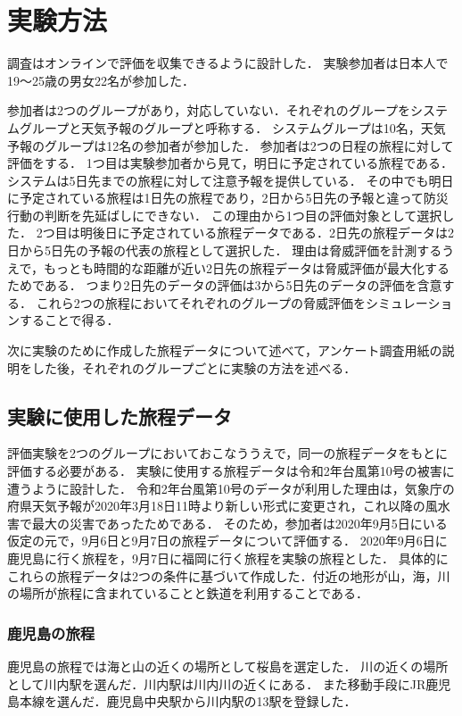 \section{実験方法}
調査はオンラインで評価を収集できるように設計した．
実験参加者は日本人で19〜25歳の男女22名が参加した．\par
参加者は2つのグループがあり，対応していない．それぞれのグループをシステムグループと天気予報のグループと呼称する．
システムグループは10名，天気予報のグループは12名の参加者が参加した．
参加者は2つの日程の旅程に対して評価をする．
1つ目は実験参加者から見て，明日に予定されている旅程である．システムは5日先までの旅程に対して注意予報を提供している．
その中でも明日に予定されている旅程は1日先の旅程であり，2日から5日先の予報と違って防災行動の判断を先延ばしにできない．
この理由から1つ目の評価対象として選択した．
2つ目は明後日に予定されている旅程データである．2日先の旅程データは2日から5日先の予報の代表の旅程として選択した．
理由は脅威評価を計測するうえで，もっとも時間的な距離が近い2日先の旅程データは脅威評価が最大化するためである．
つまり2日先のデータの評価は3から5日先のデータの評価を含意する．
これら2つの旅程においてそれぞれのグループの脅威評価をシミュレーションすることで得る．\par
次に実験のために作成した旅程データについて述べて，アンケート調査用紙の説明をした後，それぞれのグループごとに実験の方法を述べる．

\subsection{実験に使用した旅程データ}
評価実験を2つのグループにおいておこなううえで，同一の旅程データをもとに評価する必要がある．
実験に使用する旅程データは令和2年台風第10号の被害に遭うように設計した．
令和2年台風第10号のデータが利用した理由は，気象庁の府県天気予報が2020年3月18日11時より新しい形式に変更され，これ以降の風水害で最大の災害であったためである．
そのため，参加者は2020年9月5日にいる仮定の元で，9月6日と9月7日の旅程データについて評価する．
2020年9月6日に鹿児島に行く旅程を，9月7日に福岡に行く旅程を実験の旅程とした．
具体的にこれらの旅程データは2つの条件に基づいて作成した．付近の地形が山，海，川の場所が旅程に含まれていることと鉄道を利用することである．

\subsubsection{鹿児島の旅程}
鹿児島の旅程では海と山の近くの場所として桜島を選定した．
川の近くの場所として川内駅を選んだ．川内駅は川内川の近くにある．
また移動手段にJR鹿児島本線を選んだ．鹿児島中央駅から川内駅の13駅を登録した．

